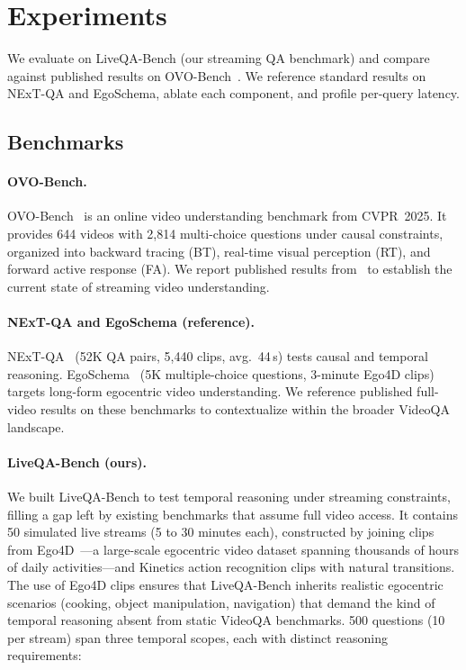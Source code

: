 \section{Experiments}
\label{sec:experiments}

We evaluate \ours on LiveQA-Bench (our streaming QA benchmark) and compare against published results on OVO-Bench~\cite{li2025ovobench}. We reference standard results on NExT-QA and EgoSchema, ablate each component, and profile per-query latency.

\subsection{Benchmarks}
\label{sec:benchmarks}

\paragraph{OVO-Bench.}
OVO-Bench~\cite{li2025ovobench} is an online video understanding benchmark from CVPR~2025.
It provides 644 videos with 2,814 multi-choice questions under causal constraints, organized into backward tracing (BT), real-time visual perception (RT), and forward active response (FA).
We report published results from~\cite{li2025ovobench} to establish the current state of streaming video understanding.

\paragraph{NExT-QA and EgoSchema (reference).}
NExT-QA~\cite{xiao2021nextqa} (52K QA pairs, 5,440 clips, avg.\ 44\,s) tests causal and temporal reasoning.
EgoSchema~\cite{mangalam2023egoschema} (5K multiple-choice questions, 3-minute Ego4D clips) targets long-form egocentric video understanding.
We reference published full-video results on these benchmarks to contextualize \ours within the broader VideoQA landscape.

\paragraph{LiveQA-Bench (ours).}
We built LiveQA-Bench to test temporal reasoning under streaming constraints, filling a gap left by existing benchmarks that assume full video access.
It contains 50 simulated live streams (5 to 30 minutes each), constructed by joining clips from Ego4D~\cite{grauman2022ego4d}---a large-scale egocentric video dataset spanning thousands of hours of daily activities---and Kinetics action recognition clips with natural transitions.
The use of Ego4D clips ensures that LiveQA-Bench inherits realistic egocentric scenarios (cooking, object manipulation, navigation) that demand the kind of temporal reasoning absent from static VideoQA benchmarks.
500 questions (10 per stream) span three temporal scopes, each with distinct reasoning requirements:

